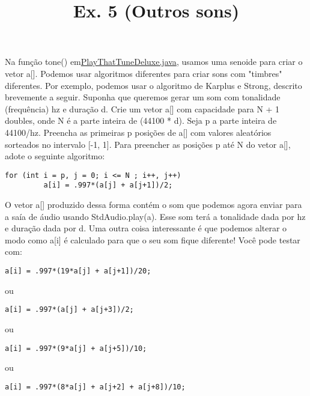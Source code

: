 \documentclass{article}
\title{Ex. 5 (Outros sons)}
\date{}
\author{}
\begin{document}
\maketitle

Na fun\c{c}\~ao tone() em\href{https://introcs.cs.princeton.edu/java/21function/PlayThatTuneDeluxe.java.htm}{PlayThatTuneDeluxe.java}, usamos uma senoide para criar o vetor a[]. Podemos usar algoritmos diferentes para criar sons com "timbres" diferentes. Por exemplo, podemos usar o algoritmo de Karplus e Strong, descrito brevemente a seguir.
\bigbreak
Suponha que queremos gerar um som com tonalidade (frequ\^encia) hz e dura\c{c}\~ao d. Crie um vetor a[] com capacidade para N + 1 doubles, onde N \'e a parte inteira de (44100 * d). Seja p a parte inteira de 44100/hz. Preencha as primeiras p posi\c{c}\~oes de a[] com valores aleat\'orios sorteados no intervalo [-1, 1]. Para preencher as posi\c{c}\~oes p at\'e N do vetor a[], adote o seguinte algoritmo:
\begin{lstlisting}[breaklines, gobble=8]
	for (int i = p, j = 0; i <= N ; i++, j++)
	     a[i] = .997*(a[j] + a[j+1])/2;
\end{lstlisting}

O vetor a[] produzido dessa forma cont\'em o som que podemos agora enviar para a sa\'ia de \'audio usando StdAudio.play(a). Esse som ter\'a a tonalidade dada por hz e dura\c{c}\~ao dada por d.
\bigbreak
Uma outra coisa interessante \'e que podemos alterar o modo como a[i] \'e calculado para que o seu som fique diferente! Voc\^e pode testar com:

\begin{lstlisting}[breaklines, gobble=8]
	a[i] = .997*(19*a[j] + a[j+1])/20;
\end{lstlisting}

ou

\begin{lstlisting}[breaklines, gobble=8]
	a[i] = .997*(a[j] + a[j+3])/2;
\end{lstlisting}

ou

\begin{lstlisting}[breaklines, gobble=8]
	a[i] = .997*(9*a[j] + a[j+5])/10;
\end{lstlisting}

ou

\begin{lstlisting}[breaklines, gobble=8]
	a[i] = .997*(8*a[j] + a[j+2] + a[j+8])/10;
\end{lstlisting}
\end{document}

